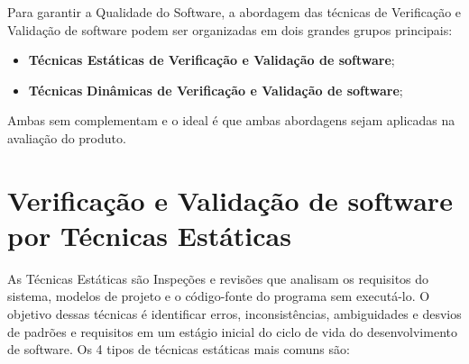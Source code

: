\documentclass[
]{book}
\begin{document}
Para garantir a Qualidade do Software, a abordagem das técnicas de Verificação e Validação de software podem ser organizadas em dois grandes grupos principais:

\begin{itemize}
\item
  \textbf{Técnicas Estáticas de Verificação e Validação de software};
\item
  \textbf{Técnicas} \textbf{Dinâmicas de Verificação e Validação de software};
\end{itemize}

Ambas sem complementam e o ideal é que ambas abordagens sejam aplicadas na avaliação do produto.

\section{Verificação e Validação de software por Técnicas Estáticas}\label{verificauxe7uxe3o-e-validauxe7uxe3o-de-software-por-tuxe9cnicas-estuxe1ticas}

As Técnicas Estáticas são Inspeções e revisões que analisam os requisitos do sistema, modelos de projeto e o código-fonte do programa sem executá-lo. O objetivo dessas técnicas é identificar erros, inconsistências, ambiguidades e desvios de padrões e requisitos em um estágio inicial do ciclo de vida do desenvolvimento de software. Os 4 tipos de técnicas estáticas mais comuns são:
\end{document}
